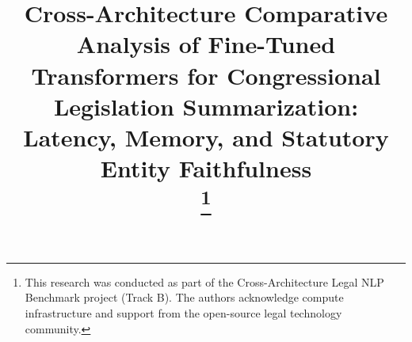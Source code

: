 \documentclass[conference]{IEEEtran}
\begin{document}
\title{Cross-Architecture Comparative Analysis of Fine-Tuned Transformers for Congressional Legislation Summarization: Latency, Memory, and Statutory Entity Faithfulness\\
\thanks{This research was conducted as part of the Cross-Architecture Legal NLP Benchmark project (Track B). The authors acknowledge compute infrastructure and support from the open-source legal technology community.}
}

\author{
\and
{}
}

\maketitle
\end{document}
